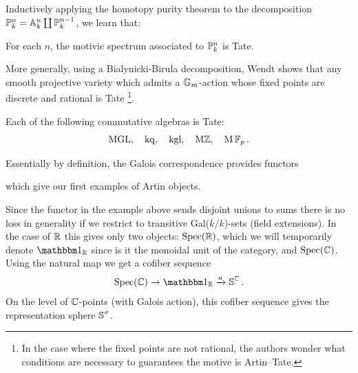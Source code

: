 Inductively applying the homotopy purity theorem \cite[Theorem 3.2.23]{MorelVoevodsky} to the decomposition $\P^n _k = \mathbb{A}^{n} _k \coprod \P^{n-1} _k$, we learn that:

\begin{exm}
  For each $n$, the motivic spectrum associated to $\P^n_k$ is Tate.
\end{exm}

More generally, using a Bialynicki-Birula decomposition, Wendt shows that any smooth projective variety which admits a $\G_m$-action whose fixed points are discrete and rational is Tate \cite{Wendt} \footnote{In the case where the fixed points are not rational, the authors wonder what conditions are necessary to guarantees the motive is Artin--Tate.}.

\begin{exm}
  Each of the following commutative algebras is Tate:
  \[ \MGL,\quad \kq,\quad \kgl,\quad \mathrm{M}\Z,\quad \mathrm{M}\F_p. \]
\end{exm}

\begin{exm} \label{exm:galois-corr}
  Essentially by definition, the Galois correspondence provides functors
  \begin{center}
  \end{center}
  which give our first examples of Artin objects.
\end{exm}

Since the functor in the example above sends disjoint unions to sums there is no loss in generality if we restrict to transitive Gal($\overline{k}/k$)-sets (field extensions). In the case of $\R$ this gives only two objects: $\Spec(\R)$, which we will temporarily denote $\o_\R$ since is it the monoidal unit of the category, and $\Spec(\C)$. Using the natural map we get a cofiber sequence
\begin{align} \Spec(\C) \to \o_\R \xrightarrow{a} \Ss^{\C}. \label{eq:pic-C} \end{align}
On the level of $\C$-points (with Galois action), this cofiber sequence gives the representation sphere $\Ss^{\sigma}$.




